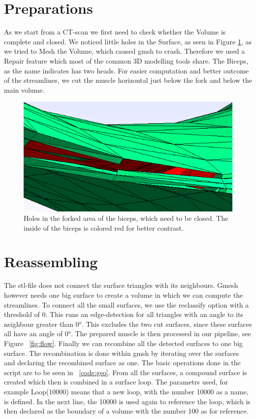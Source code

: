 \documentclass[preprint,journal]{vgtc}       %
\begin{document}
\section{Preparations}
As we start from a CT-scan we first need to check whether the Volume is complete and closed. We noticed little holes in the Surface, as seen  in Figure \ref{fig:holes}, as we tried to Mesh the Volume, which caused gmsh to crash. 
Therefore we used a Repair feature which most of the common 3D modelling tools share. 
The Biceps, as the name indicates has two heads. For easier computation and better outcome of the streamlines, we cut  the muscle horizontal just below the fork and below the main volume. 

\begin{figure}
	\begin{center}
		\includegraphics[width = .6\linewidth]{holes.png}
	\end{center}
	\caption{Holes in the forked area of the biceps, which need to be closed. The inside of the biceps is colored red for better contrast.}
	\label{fig:holes}
\end{figure}

\section{Reassembling}
The stl-file does not connect the surface triangles with its neighbours. Gmesh however needs one big surface to create a volume in which we can compute the streamlines. To connect all the small surfaces, we use the reclassify option with a threshold of 0. This runs an edge-detection for all triangles with an angle to its neighbour greater than \ang{0}. This excludes the two cut surfaces, since these surfaces all have an angle of \ang{0}. The prepared muscle is then processed in our pipeline, see Figure ~\ref{fig:flow}. Finally we can recombine all the detected surfaces to one big surface. The recombination is done within gmsh by iterating over the surfaces and declaring the recombined surface as one. The basic operations done in the script are to be seen in ~\ref{code:geo}. From all the surfaces, a compound surface is created which then is combined in a surface loop. The parametrs used, for example Loop(10000) means that a new loop, with the number 10000 as a name, is defined. In the next line, the 10000 is used again to reference the loop, which is then declared as the boundary of a volume with the number 100 as for reference. 
\end{document}
